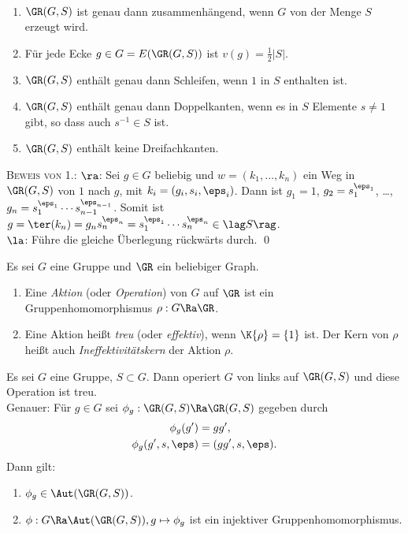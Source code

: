 \BEM\label{bem_GRGS}\
\begin{enumerate}
\item $\GR(G,S)$ ist genau dann zusammenhängend, wenn
$G$ von der Menge $S$ erzeugt wird.
\item Für jede Ecke $g\in G=E(\GR(G,S))$ ist $v(g)=\frac{1}{2}|S|$.
\item $\GR(G,S)$ enthält genau dann Schleifen, wenn $1$ in $S$
enthalten ist.
\item $\GR(G,S)$ enthält genau dann Doppelkanten, wenn es in $S$
Elemente $s\neq 1$ gibt, so dass auch $s^{-1}\in S$ ist.
\item $\GR(G,S)$ enthält keine Dreifachkanten.
\end{enumerate}
\textsc{Beweis von 1.:} \glqq$\ra$\grqq: Sei $g\in G$ beliebig und
$w=(k_1,\ldots,k_n)$ ein Weg in $\GR(G,S)$ von $1$ nach $g$,
mit $k_i=(g_i, s_i, \eps_i)$. Dann ist
$g_1=1$, $g_2=s_1^{\eps_1}$, \ldots,
$g_n=s_1^{\eps_1}\cdots s_{n-1}^{\eps_{n-1}}$.
Somit ist $g=\ter(k_n)=g_n s_n^{\eps_n}=
s_1^{\eps_1}\cdots s_n^{\eps_n} \in\lag S\rag$.\\
\glqq $\la$\grqq: Führe die gleiche Überlegung rückwärts durch.
\qed

\DB Es sei $G$ eine Gruppe und $\GR$ ein beliebiger Graph.
\begin{enumerate}
\item Eine \emph{Aktion} (oder \emph{Operation}) von $G$ auf $\GR$ ist ein
Gruppenhomomorphismus $\rho:G\Ra\GR$.
\item Eine Aktion heißt \emph{treu}
(oder \emph{effektiv}\index{effektiv (siehe treue Aktion)}),
wenn $\K{\rho}=\{1\}$ ist. Der Kern von $\rho$ heißt auch
\emph{Ineffektivitätskern}
der Aktion $\rho$.
\end{enumerate}

\BEM Es sei $G$ eine Gruppe, $S\subset G$. Dann operiert $G$ von
links auf $\GR(G,S)$ und diese Operation ist treu.\\
Genauer: Für $g\in G$ sei $\phi_g:\GR(G,S)\Ra\GR(G,S)$ gegeben durch
\begin{align*}
\phi_g(g') &= gg', \\
\phi_g(g',s,\eps) &= (gg',s,\eps).
\end{align*}
Dann gilt:
\begin{enumerate}
\item $\phi_g \in \Aut(\GR(G,S))$.
\item $\phi:G\Ra\Aut(\GR(G,S)), g\mapsto \phi_g$ ist ein injektiver
Gruppenhomomorphismus.
\end{enumerate}

